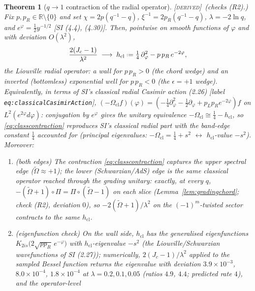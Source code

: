 \documentclass[11pt,a4paper]{article}
\providecommand{\coloneqq}{\mathrel{\vcenter{\baselineskip0.5ex \lineskiplimit0pt
      \hbox{\scriptsize.}\hbox{\scriptsize.}}}=}
\newcommand{\DERIVED}{{\color{teal}\textsc{[derived]}}}
\theoremstyle{definition}
\theoremstyle{plain}
\newtheorem{theorem}[definition]{Theorem}
\newcommand{\Cas}{\Omega}                       %
\newcommand{\tCas}{\tilde\Omega}                %
\newcommand{\R}{\mathbb{R}}
\begin{document}
\begin{theorem}[$q\to1$ contraction of the radial operator]\label{thm:radialclassical}
\DERIVED\ (checks (R2).) Fix $p,p_{R}\in\R\setminus\{0\}$ and set
$\chi=2p(q^{-1}-q)$, $\xi^{-1}=2p_{R}(q^{-1}-q)$, $\lambda=-2\ln q$, and
$e^{\varphi}=\tfrac12y^{-1/2}$ [SI (4.4), (4.30)]. Then, pointwise on smooth functions of
$\varphi$ and with deviation $O(\lambda^{2})$,
\begin{equation}\label{eq:classcontraction}
  \frac{2(J_{c}-1)}{\lambda^{2}}
  \;\longrightarrow\;
  h_{\mathrm{cl}}\coloneqq\tfrac14\,\partial_{\varphi}^{2}-p\,p_{R}\,e^{-2\varphi},
\end{equation}
the Liouville radial operator: a wall for $p\,p_{R}>0$ (the chord wedge) and an inverted
(bottomless) exponential well for $p\,p_{R}<0$ (the $\epsilon=+1$ wedge). Equivalently, in
terms of SI's classical radial Casimir action (2.26) [label
\texttt{eq:classicalCasimirAction}],
$(-\Cas_{\mathrm{cl}}f)(\varphi)=(-\tfrac14\partial^{2}_{\varphi}-\tfrac12\partial_{\varphi}
+p_{L}p_{R}e^{-2\varphi})f$ on $L^{2}(e^{2\varphi}d\varphi)$: conjugation by $e^{\varphi}$
gives the unitary equivalence $-\Cas_{\mathrm{cl}}\cong\tfrac14-h_{\mathrm{cl}}$, so
\eqref{eq:classcontraction} reproduces SI's classical radial part with the band-edge constant
$\tfrac14$ accounted for (principal eigenvalues: $-\Cas_{\mathrm{cl}}=\tfrac14+s^{2}$
$\leftrightarrow$ $h_{\mathrm{cl}}$-value $-s^{2}$). Moreover:
\begin{enumerate}[label=(\alph*)]
\item \emph{(both edges)} The contraction \eqref{eq:classcontraction} captures the upper
spectral edge ($\tCas\approx+1$); the lower (Schwarzian/AdS) edge is the \emph{same} classical
operator reached through the grading unitary: exactly, at every $q$,
$-(\tCas+1)\circ\Pi=\Pi\circ(\tCas-1)$ on each slice
(Lemma~\ref{lem:gradingchord}; check (R2), deviation $0$), so
$-2(\tCas+1)/\lambda^{2}$ on the $(-1)^{m}$-twisted sector contracts to the same
$h_{\mathrm{cl}}$.
\item \emph{(eigenfunction check)} On the wall side, $h_{\mathrm{cl}}$ has the generalised
eigenfunctions $K_{2is}\bigl(2\sqrt{pp_{R}}\,e^{-\varphi}\bigr)$ with
$h_{\mathrm{cl}}$-eigenvalue $-s^{2}$ (the Liouville/Schwarzian wavefunctions of SI (2.27));
numerically, $2(J_{c}-1)/\lambda^{2}$ applied to the sampled Bessel function returns the
eigenvalue with deviation $3.9\times10^{-3}$, $8.0\times10^{-4}$, $1.8\times10^{-4}$ at
$\lambda=0.2,0.1,0.05$ (ratios $4.9$, $4.4$; predicted rate $4$), and the operator-level

\end{enumerate}
\end{theorem}
\end{document}
